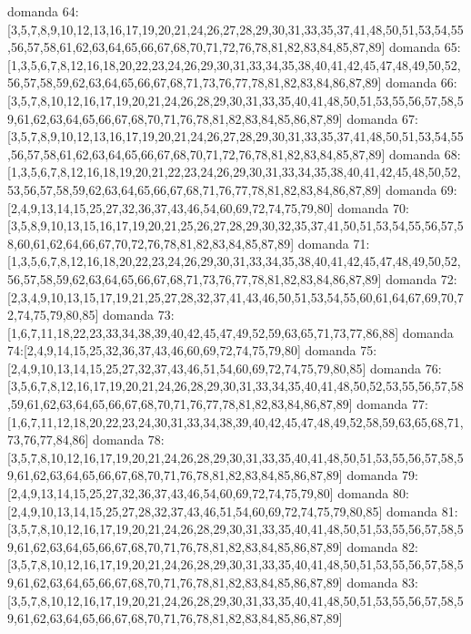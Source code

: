 domanda 64:[3,5,7,8,9,10,12,13,16,17,19,20,21,24,26,27,28,29,30,31,33,35,37,41,48,50,51,53,54,55,56,57,58,61,62,63,64,65,66,67,68,70,71,72,76,78,81,82,83,84,85,87,89]
domanda 65:[1,3,5,6,7,8,12,16,18,20,22,23,24,26,29,30,31,33,34,35,38,40,41,42,45,47,48,49,50,52,56,57,58,59,62,63,64,65,66,67,68,71,73,76,77,78,81,82,83,84,86,87,89]
domanda 66:[3,5,7,8,10,12,16,17,19,20,21,24,26,28,29,30,31,33,35,40,41,48,50,51,53,55,56,57,58,59,61,62,63,64,65,66,67,68,70,71,76,78,81,82,83,84,85,86,87,89]
domanda 67:[3,5,7,8,9,10,12,13,16,17,19,20,21,24,26,27,28,29,30,31,33,35,37,41,48,50,51,53,54,55,56,57,58,61,62,63,64,65,66,67,68,70,71,72,76,78,81,82,83,84,85,87,89]
domanda 68:[1,3,5,6,7,8,12,16,18,19,20,21,22,23,24,26,29,30,31,33,34,35,38,40,41,42,45,48,50,52,53,56,57,58,59,62,63,64,65,66,67,68,71,76,77,78,81,82,83,84,86,87,89]
domanda 69:[2,4,9,13,14,15,25,27,32,36,37,43,46,54,60,69,72,74,75,79,80]
domanda 70:[3,5,8,9,10,13,15,16,17,19,20,21,25,26,27,28,29,30,32,35,37,41,50,51,53,54,55,56,57,58,60,61,62,64,66,67,70,72,76,78,81,82,83,84,85,87,89]
domanda 71:[1,3,5,6,7,8,12,16,18,20,22,23,24,26,29,30,31,33,34,35,38,40,41,42,45,47,48,49,50,52,56,57,58,59,62,63,64,65,66,67,68,71,73,76,77,78,81,82,83,84,86,87,89]
domanda 72:[2,3,4,9,10,13,15,17,19,21,25,27,28,32,37,41,43,46,50,51,53,54,55,60,61,64,67,69,70,72,74,75,79,80,85]
domanda 73:[1,6,7,11,18,22,23,33,34,38,39,40,42,45,47,49,52,59,63,65,71,73,77,86,88]
domanda 74:[2,4,9,14,15,25,32,36,37,43,46,60,69,72,74,75,79,80]
domanda 75:[2,4,9,10,13,14,15,25,27,32,37,43,46,51,54,60,69,72,74,75,79,80,85]
domanda 76:[3,5,6,7,8,12,16,17,19,20,21,24,26,28,29,30,31,33,34,35,40,41,48,50,52,53,55,56,57,58,59,61,62,63,64,65,66,67,68,70,71,76,77,78,81,82,83,84,86,87,89]
domanda 77:[1,6,7,11,12,18,20,22,23,24,30,31,33,34,38,39,40,42,45,47,48,49,52,58,59,63,65,68,71,73,76,77,84,86]
domanda 78:[3,5,7,8,10,12,16,17,19,20,21,24,26,28,29,30,31,33,35,40,41,48,50,51,53,55,56,57,58,59,61,62,63,64,65,66,67,68,70,71,76,78,81,82,83,84,85,86,87,89]
domanda 79:[2,4,9,13,14,15,25,27,32,36,37,43,46,54,60,69,72,74,75,79,80]
domanda 80:[2,4,9,10,13,14,15,25,27,28,32,37,43,46,51,54,60,69,72,74,75,79,80,85]
domanda 81:[3,5,7,8,10,12,16,17,19,20,21,24,26,28,29,30,31,33,35,40,41,48,50,51,53,55,56,57,58,59,61,62,63,64,65,66,67,68,70,71,76,78,81,82,83,84,85,86,87,89]
domanda 82:[3,5,7,8,10,12,16,17,19,20,21,24,26,28,29,30,31,33,35,40,41,48,50,51,53,55,56,57,58,59,61,62,63,64,65,66,67,68,70,71,76,78,81,82,83,84,85,86,87,89]
domanda 83:[3,5,7,8,10,12,16,17,19,20,21,24,26,28,29,30,31,33,35,40,41,48,50,51,53,55,56,57,58,59,61,62,63,64,65,66,67,68,70,71,76,78,81,82,83,84,85,86,87,89]
